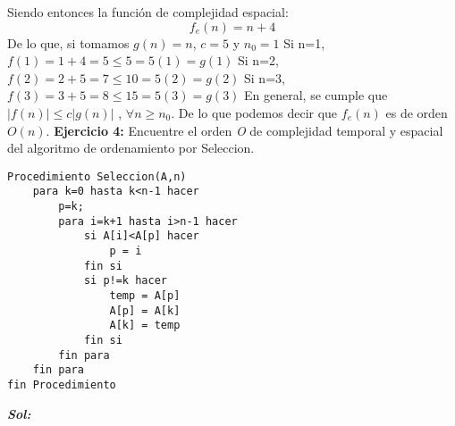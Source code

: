 \documentclass[12pt, letterpaper, twoside]{article}
\begin{document}
Siendo entonces la función de complejidad espacial:
\[f_{e}(n)=n+4\]
De lo que, si tomamos $g(n)=n$, $c=5$ y $n_{0}=1$
\newline
Si n=1,
\center$f(1)=1+4=5\leq 5=5(1)=g(1)$
\justify
Si n=2,
\center$f(2)=2+5=7\leq 10=5(2)=g(2)$
\justify
Si n=3,
\center$f(3)=3+5=8\leq 15=5(3)=g(3)$
\justify
En general, se cumple que
\center$|f(n)|\leq c|g(n)|$ , $\forall n\geq n_{0}$.
\justify
De lo que podemos decir que $f_{e}(n)$ es de orden $O(n)$.
\newpage
\textbf{Ejercicio 4:} Encuentre el orden \textit{O} de complejidad temporal y espacial
del algoritmo de ordenamiento por Seleccion.
\begin{lstlisting}
Procedimiento Seleccion(A,n)
	para k=0 hasta k<n-1 hacer
		p=k;
		para i=k+1 hasta i>n-1 hacer
			si A[i]<A[p] hacer
				p = i
			fin si
			si p!=k hacer
				temp = A[p]
				A[p] = A[k]
				A[k] = temp
			fin si
		fin para
	fin para
fin Procedimiento
\end{lstlisting}
\justify
\textbf{\textit{Sol:}}
\end{document}
